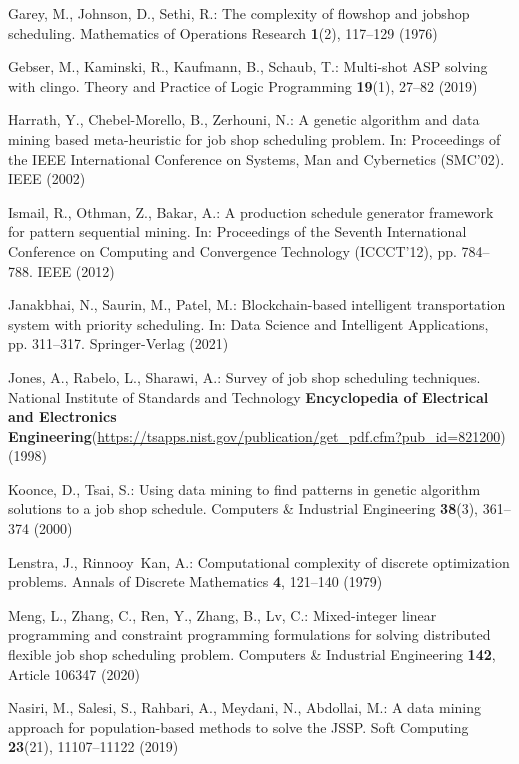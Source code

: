 \begin{thebibliography}{10}
Garey, M., Johnson, D., Sethi, R.: The complexity of flowshop and jobshop
  scheduling. Mathematics of Operations Research  \textbf{1}(2),  117--129
  (1976)

Gebser, M., Kaminski, R., Kaufmann, B., Schaub, T.: Multi-shot {ASP} solving
  with clingo. Theory and Practice of Logic Programming  \textbf{19}(1),
  27--82 (2019)

Harrath, Y., Chebel-Morello, B., Zerhouni, N.: A genetic algorithm and data
  mining based meta-heuristic for job shop scheduling problem. In: Proceedings
  of the IEEE International Conference on Systems, Man and Cybernetics
  (SMC'02). IEEE (2002)

Ismail, R., Othman, Z., Bakar, A.: A production schedule generator framework
  for pattern sequential mining. In: Proceedings of the Seventh International
  Conference on Computing and Convergence Technology (ICCCT'12), pp. 784--788.
  IEEE (2012)

Janakbhai, N., Saurin, M., Patel, M.: Blockchain-based intelligent
  transportation system with priority scheduling. In: Data Science and
  Intelligent Applications, pp. 311--317. Springer-Verlag (2021)

Jones, A., Rabelo, L., Sharawi, A.: Survey of job shop scheduling techniques.
  National Institute of Standards and Technology  \textbf{Encyclopedia of
  Electrical and Electronics
  Engineering}(\url{https://tsapps.nist.gov/publication/get_pdf.cfm?pub_id=821200})
  (1998)

Koonce, D., Tsai, S.: Using data mining to find patterns in genetic algorithm
  solutions to a job shop schedule. Computers \& Industrial Engineering
  \textbf{38}(3),  361--374 (2000)

Lenstra, J., Rinnooy~Kan, A.: Computational complexity of discrete optimization
  problems. Annals of Discrete Mathematics  \textbf{4},  121--140 (1979)

Meng, L., Zhang, C., Ren, Y., Zhang, B., Lv, C.: Mixed-integer linear
  programming and constraint programming formulations for solving distributed
  flexible job shop scheduling problem. Computers \& Industrial Engineering
  \textbf{142},  Article 106347 (2020)

Nasiri, M., Salesi, S., Rahbari, A., Meydani, N., Abdollai, M.: A data mining
  approach for population-based methods to solve the {JSSP}. Soft Computing
  \textbf{23}(21),  11107--11122 (2019)


\end{thebibliography}
